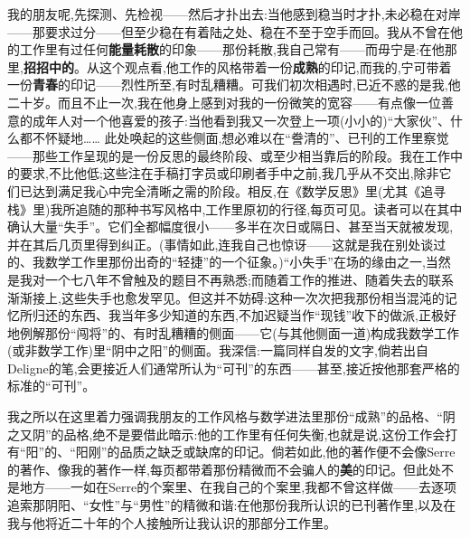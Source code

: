 我的朋友呢,先探测、先检视——然后才扑出去:当他感到稳当时才扑,未必稳在对岸——那要求过分——但至少稳在有着陆之处、稳在不至于空手而回。我从不曾在他的工作里有过任何\textbf{能量耗散}的印象——那份耗散,我自己常有——而毋宁是:在他那里,\textbf{招招中的}。从这个观点看,他工作的风格带着一份\textbf{成熟}的印记,而我的,宁可带着一份\textbf{青春}的印记——烈性所至,有时乱糟糟。可我们初次相遇时,已近不惑的是我,他二十岁。而且不止一次,我在他身上感到对我的一份微笑的宽容——有点像一位善意的成年人对一个他喜爱的孩子:当他看到我又一次登上一项(小小的)“大家伙”、什么都不怀疑地……
此处唤起的这些侧面,想必难以在“誊清的”、已刊的工作里察觉——那些工作呈现的是一份反思的最终阶段、或至少相当靠后的阶段。我在工作中的要求,不比他低;这些注在手稿打字员或印刷者手中之前,我几乎从不交出,除非它们已达到满足我心中完全清晰之需的阶段。相反,在《数学反思》里(尤其《追寻栈》里)我所追随的那种书写风格中,工作里原初的行径,每页可见。读者可以在其中确认大量“失手”。它们全都幅度很小——多半在次日或隔日、甚至当天就被发现,并在其后几页里得到纠正。(事情如此,连我自己也惊讶——这就是我在别处谈过的、我数学工作里那份出奇的“轻捷”的一个征象。)“小失手”在场的缘由之一,当然是我对一个七八年不曾触及的题目不再熟悉;而随着工作的推进、随着失去的联系渐渐接上,这些失手也愈发罕见。但这并不妨碍:这种一次次把我那份相当混沌的记忆所归还的东西、我当年多少知道的东西,不加迟疑当作“现钱”收下的做派,正极好地例解那份“闯将”的、有时乱糟糟的侧面——它(与其他侧面一道)构成我数学工作(或非数学工作)里“阴中之阳”的侧面。我深信:一篇同样自发的文字,倘若出自Deligne的笔,会更接近人们通常所认为“可刊”的东西——甚至,接近按他那套严格的标准的“可刊”。

\dmark{}我之所以在这里着力强调我朋友的工作风格与数学进法里那份“成熟”的品格、“阴之又阴”的品格,绝不是要借此暗示:他的工作里有任何失衡,也就是说,这份工作会打有“阳”的、“阳刚”的品质之缺乏或缺席的印记。倘若如此,他的著作便不会像Serre的著作、像我的著作一样,每页都带着那份精微而不会骗人的\textbf{美}的印记。但此处不是地方——一如在Serre的个案里、在我自己的个案里,我都不曾这样做——去逐项追索那阴阳、“女性”与“男性”的精微和谐:在他那份我所认识的已刊著作里,以及在我与他将近二十年的个人接触所让我认识的那部分工作里。


